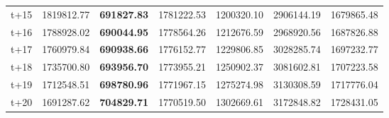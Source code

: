 \begin{table}[H]
\begin{tabular}{lrrrrrr}
t+15  & 1819812.77  & \textbf{691827.83}  & 1781222.53  & 1200320.10  & 2906144.19  & 1679865.48  \\
t+16  & 1788928.02  & \textbf{690044.95}  & 1778564.26  & 1212676.59  & 2968920.56  & 1687826.88  \\
t+17  & 1760979.84  & \textbf{690938.66}  & 1776152.77  & 1229806.85  & 3028285.74  & 1697232.77  \\
t+18  & 1735700.80  & \textbf{693956.70}  & 1773955.21  & 1250902.37  & 3081602.81  & 1707223.58  \\
t+19  & 1712548.51  & \textbf{698780.96}  & 1771967.15  & 1275274.98  & 3130308.59  & 1717776.04  \\
t+20  & 1691287.62  & \textbf{704829.71}  & 1770519.50  & 1302669.61  & 3172848.82  & 1728431.05  \\

\bottomrule
\end{tabular}
\end{table}
